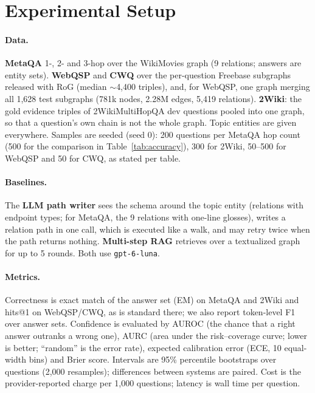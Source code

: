 \documentclass[11pt]{article}
\begin{document}
\section{Experimental Setup}
\label{sec:setup}

\paragraph{Data.} \textbf{MetaQA} \citep{zhang2018metaqa} 1-, 2- and 3-hop over the
WikiMovies graph (9 relations; answers are entity sets). \textbf{WebQSP}
\citep{yih2016webqsp} and \textbf{CWQ} \citep{talmor2018cwq} over the per-question
Freebase subgraphs released with RoG (median $\sim$4,400 triples), and, for WebQSP, one
graph merging all 1,628 test subgraphs (781k nodes, 2.28M edges, 5,419 relations).
\textbf{2Wiki}: the gold evidence triples of 2WikiMultiHopQA \citep{ho2020twowiki} dev
questions pooled into one graph, so that a question's own chain is not the whole graph.
Topic entities are given everywhere. Samples are seeded (seed 0): 200 questions per
MetaQA hop count (500 for the comparison in Table~\ref{tab:accuracy}), 300 for 2Wiki, 50--500 for WebQSP and 50 for CWQ, as
stated per table.

\paragraph{Baselines.} The \textbf{LLM path writer} sees the schema around the topic
entity (relations with endpoint types; for MetaQA, the 9 relations with one-line
glosses), writes a relation path in one call, which is executed like a walk, and may
retry twice when the path returns nothing. \textbf{Multi-step RAG} retrieves over a
textualized graph for up to 5 rounds. Both use \texttt{gpt-6-luna}.

\paragraph{Metrics.} Correctness is exact match of the answer set (EM) on MetaQA and
2Wiki and hits@1 on WebQSP/CWQ, as is standard there; we also report token-level F1 over
answer sets. Confidence is evaluated by AUROC (the chance that a right answer outranks a
wrong one), AURC (area under the risk--coverage curve; lower is better; ``random'' is
the error rate), expected calibration error (ECE, 10 equal-width bins) and Brier score.
Intervals are 95\% percentile bootstraps over questions (2,000 resamples); differences
between systems are paired. Cost is the provider-reported charge per 1,000 questions;
latency is wall time per question.
\end{document}
